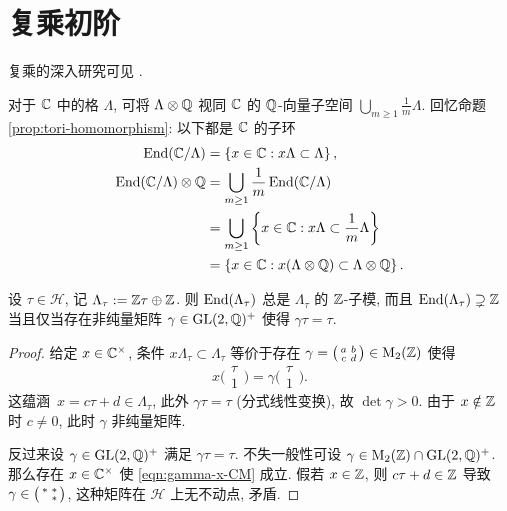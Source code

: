 \section{复乘初阶}\label{sec:CM} 
复乘的深入研究可见 \cite[\S\S 4.4---5.4]{Shi71}.

对于 $\mathbb{C}$ 中的格 $\Lambda$, 可将 $\Lambda \otimes \mathbb{Q}$ 视同 $\mathbb{C}$ 的 $\mathbb{Q}$-向量子空间 $\bigcup_{m \geq 1} \frac{1}{m}\Lambda$. 回忆命题 \ref{prop:tori-homomorphism}: 以下都是 $\mathbb{C}$ 的子环
\begin{align*}
	\operatorname{End}(\mathbb{C}/\Lambda) & = \left\{ x \in \mathbb{C}: x\Lambda \subset \Lambda \right\}, \\
	\operatorname{End}(\mathbb{C}/\Lambda) \otimes \mathbb{Q} & = \bigcup_{m \geq 1} \frac{1}{m} \operatorname{End}(\mathbb{C}/\Lambda) \\
	& = \bigcup_{m \geq 1} \left\{ x \in \mathbb{C}: x\Lambda \subset \frac{1}{m} \Lambda \right\} \\
	& = \left\{ x \in \mathbb{C}: x(\Lambda \otimes \mathbb{Q}) \subset \Lambda \otimes \mathbb{Q} \right\}.
\end{align*}

\begin{lemma}\label{prop:CM-prep1}
	设 $\tau \in \mathcal{H}$, 记 $\Lambda_\tau := \mathbb{Z}\tau \oplus \mathbb{Z}$. 则 $\operatorname{End}(\Lambda_\tau)$ 总是 $\Lambda_\tau$ 的 $\mathbb{Z}$-子模, 而且 $\operatorname{End}(\Lambda_\tau) \supsetneq \mathbb{Z}$ 当且仅当存在非纯量矩阵 $\gamma \in \operatorname{GL}(2, \mathbb{Q})^+$ 使得 $\gamma\tau = \tau$.
\end{lemma}
\begin{proof}
	给定 $x \in \mathbb{C}^\times$, 条件 $x \Lambda_\tau \subset \Lambda_\tau$ 等价于存在 $\gamma = \bigl(\begin{smallmatrix} a & b \\ c & d \end{smallmatrix}\bigr) \in \operatorname{M}_2(\mathbb{Z})$ 使得
	\begin{equation}\label{eqn:gamma-x-CM}
		x\bigl( \begin{smallmatrix} \tau \\ 1 \end{smallmatrix} \bigr) = \gamma \bigl( \begin{smallmatrix} \tau \\ 1 \end{smallmatrix} \bigr).
	\end{equation}
	这蕴涵~$x = c\tau + d \in \Lambda_\tau$, 此外 $\gamma\tau = \tau$ (分式线性变换), 故 $\det\gamma > 0$. 由于 $x \notin \mathbb{Z}$ 时 $c \neq 0$, 此时 $\gamma$ 非纯量矩阵.
	
	反过来设 $\gamma \in \operatorname{GL}(2,\mathbb{Q})^+$ 满足 $\gamma\tau = \tau$. 不失一般性可设 $\gamma \in \operatorname{M}_2(\mathbb{Z}) \cap \operatorname{GL}(2, \mathbb{Q})^+$. 那么存在 $x \in \mathbb{C}^\times$ 使 \eqref{eqn:gamma-x-CM} 成立. 假若 $x \in \mathbb{Z}$, 则 $c\tau + d \in \mathbb{Z}$ 导致 $\gamma \in \bigl(\begin{smallmatrix} * & * \\  & * \end{smallmatrix}\bigr)$, 这种矩阵在 $\mathcal{H}$ 上无不动点, 矛盾.
\end{proof}

